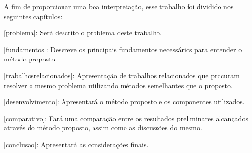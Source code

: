 A fim de proporcionar uma boa interpretação, esse trabalho foi dividido nos
seguintes capítulos:

\autoref{problema}: Será descrito o problema deste trabalho.

\autoref{fundamentos}: Descreve os principais fundamentos necessários para entender o método proposto.

\autoref{trabalhosrelacionados}: Apresentação de trabalhos relacionados que procuram resolver o mesmo problema utilizando métodos semelhantes que o proposto.

\autoref{desenvolvimento}: Apresentará o método proposto e os componentes utilizados.

\autoref{comparativo}: Fará uma comparação entre os resultados preliminares alcançados através do método proposto, assim como as discussões do mesmo.

\autoref{conclusao}: Apresentará as considerações finais.

